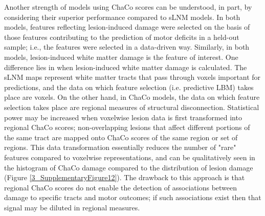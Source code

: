 \documentclass[phd,tocprelim]{cornell}
\begin{document}
Another strength of models using ChaCo scores can be understood, in part, by considering their superior performance compared to sLNM models. In both models, features reflecting lesion-induced damage were selected on the basis of those features contributing to the prediction of motor deficits in a held-out sample; i.e., the features were selected in a data-driven way. Similarly, in both models, lesion-induced white matter damage is the feature of interest. One difference lies in when lesion-induced white matter damage is calculated. The sLNM maps represent white matter tracts that pass through voxels important for predictions, and the data on which feature selection (i.e. predictive LBM) takes place are voxels. On the other hand, in ChaCo models, the data on which feature selection takes place are regional measures of structural disconnection. Statistical power may be increased when voxelwise lesion data is first transformed into regional ChaCo scores; non-overlapping lesions that affect different portions of the same tract are mapped onto ChaCo scores of the same region or set of regions. This data transformation essentially reduces the number of "rare" features compared to voxelwise representations, and can be qualitatively seen in the histogram of ChaCo damage compared to the distribution of lesion damage (Figure \ref{3_SupplementaryFigure12}). The drawback to this approach is that regional ChaCo scores do not enable the detection of associations between damage to specific tracts and motor outcomes; if such associations exist then that signal may be diluted in regional measures. 
\end{document}
